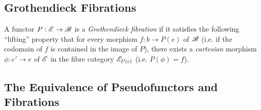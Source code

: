 \documentclass[12pt]{article}
\theoremstyle{definition}
\theoremstyle{remark}
\begin{document}
\subsection{Grothendieck Fibrations}

A functor $P : \mathscr{E} \to \mathscr{B}$ is a \textit{Grothendieck fibration} if it satisfies the following ``lifting'' property that for every morphism $f : b \to P(e)$ of $\mathscr{B}$ (i.e. if the codomain of $f$ is contained in the image of $P$), there exists a \textit{cartesian} morphism $\phi : e' \to e$ of $\mathscr{E}$ in the fibre category $\mathscr{E}_{P(e)}$ (i.e. $P(\phi) = f$).

\subsection{The Equivalence of Pseudofunctors and Fibrations}
\end{document}
